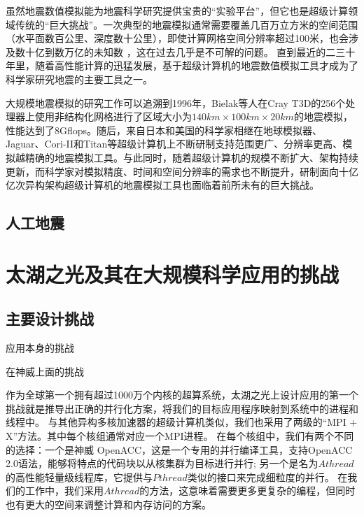 \documentclass[degree=doctor]{thuthesis}
\begin{document}
虽然地震数值模拟能为地震科学研究提供宝贵的“实验平台”，但它也是超级计算领域传统的“巨大挑战”。一次典型的地震模拟通常需要覆盖几百万立方米的空间范围（水平面数百公里、深度数十公里），即使计算网格空间分辨率超过100米，也会涉及数十亿到数万亿的未知数 \citep{cui2010scalable}，这在过去几乎是不可解的问题。 直到最近的二三十年里，随着高性能计算的迅猛发展，基于超级计算机的地震数值模拟工具才成为了科学家研究地震的主要工具之一。

大规模地震模拟的研究工作可以追溯到1996年，Bielak等人在Cray T3D的256个处理器上使用非结构化网格进行了区域大小为$140km \times 100km \times 20km$的地震模拟\citep{bao1996earthquake}，性能达到了8Gflops。随后，来自日本和美国的科学家相继在地球模拟器\cite{chen2006glueball}、Jaguar\cite{carrington2008high}、Cori-II\citep{breuer2017edge}和Titan\cite{cui2013physics}等超级计算机上不断研制支持范围更广、分辨率更高、模拟越精确的地震模拟工具。与此同时，随着超级计算机的规模不断扩大、架构持续更新，而科学家对模拟精度、时间和空间分辨率的需求也不断提升，研制面向十亿亿次异构架构超级计算机的地震模拟工具也面临着前所未有的巨大挑战。

\subsection{人工地震}


\section{太湖之光及其在大规模科学应用的挑战}
\label{sec:sunway}



\subsection{主要设计挑战}
\label{sec:sunway-challenge}

应用本身的挑战

在神威上面的挑战

作为全球第一个拥有超过1000万个内核的超算系统，太湖之光上设计应用的第一个挑战就是推导出正确的并行化方案，将我们的目标应用程序映射到系统中的进程和线程中。 与其他异构多核加速器的超级计算机类似，我们也采用了两级的“MPI + X”方法。其中每个核组通常对应一个MPI进程。 在每个核组中，我们有两个不同的选择：一个是神威 OpenACC，这是一个专用的并行编译工具，支持OpenACC 2.0语法，能够将特点的代码块以从核集群为目标进行并行; 另一个是名为$ Athread$的高性能轻量级线程库，它提供与$ Pthread $类似的接口来完成细粒度的并行。 在我们的工作中，我们采用$ Athread $的方法，这意味着需要更多更复杂的编程，但同时也有更大的空间来调整计算和内存访问的方案。
\end{document}
